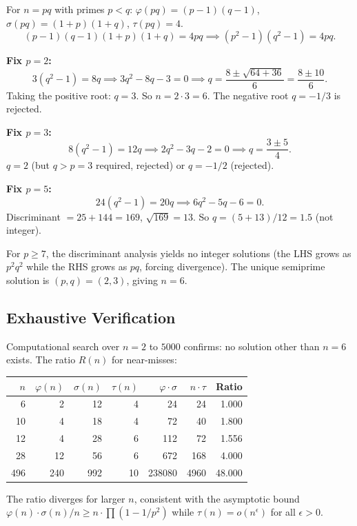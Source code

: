 \documentclass[11pt,a4paper]{article}
\begin{document}
For $n = pq$ with primes $p < q$: $\varphi(pq) = (p-1)(q-1)$, $\sigma(pq) = (1+p)(1+q)$, $\tau(pq) = 4$.
\[
(p-1)(q-1)(1+p)(1+q) = 4pq \implies (p^2 - 1)(q^2 - 1) = 4pq.
\]

\textbf{Fix $p = 2$:}
\[
3(q^2 - 1) = 8q \implies 3q^2 - 8q - 3 = 0 \implies q = \frac{8 \pm \sqrt{64 + 36}}{6} = \frac{8 \pm 10}{6}.
\]
Taking the positive root: $q = 3$. So $n = 2 \cdot 3 = 6$. The negative root $q = -1/3$ is rejected.

\textbf{Fix $p = 3$:}
\[
8(q^2 - 1) = 12q \implies 2q^2 - 3q - 2 = 0 \implies q = \frac{3 \pm 5}{4}.
\]
$q = 2$ (but $q > p = 3$ required, rejected) or $q = -1/2$ (rejected).

\textbf{Fix $p = 5$:}
\[
24(q^2 - 1) = 20q \implies 6q^2 - 5q - 6 = 0.
\]
Discriminant $= 25 + 144 = 169$, $\sqrt{169} = 13$. So $q = (5 + 13)/12 = 1.5$ (not integer).

For $p \geq 7$, the discriminant analysis yields no integer solutions (the LHS grows as $p^2 q^2$ while the RHS grows as $pq$, forcing divergence). The unique semiprime solution is $(p, q) = (2, 3)$, giving $n = 6$.

\subsection{Exhaustive Verification}

Computational search over $n = 2$ to $5000$ confirms: no solution other than $n = 6$ exists. The ratio $R(n)$ for near-misses:

\begin{center}
\begin{tabular}{rrrrrrr}
\toprule
$n$ & $\varphi(n)$ & $\sigma(n)$ & $\tau(n)$ & $\varphi \cdot \sigma$ & $n \cdot \tau$ & Ratio \\
\midrule
6   & 2   & 12  & 4  & 24     & 24   & 1.000 \\
10  & 4   & 18  & 4  & 72     & 40   & 1.800 \\
12  & 4   & 28  & 6  & 112    & 72   & 1.556 \\
28  & 12  & 56  & 6  & 672    & 168  & 4.000 \\
496 & 240 & 992 & 10 & 238080 & 4960 & 48.000 \\
\bottomrule
\end{tabular}
\end{center}

The ratio diverges for larger $n$, consistent with the asymptotic bound $\varphi(n) \cdot \sigma(n) / n \geq n \cdot \prod(1 - 1/p^2)$ while $\tau(n) = o(n^\epsilon)$ for all $\epsilon > 0$.
\end{document}
